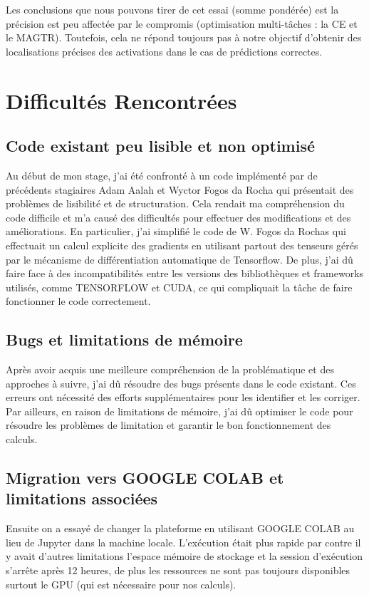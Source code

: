 \documentclass{report}
\begin{document}
{\newpage
Les conclusions que nous pouvons tirer de cet essai (somme pondérée) est la précision est peu affectée par le compromis (optimisation multi-tâches : la CE et le MAGTR). Toutefois, cela ne répond toujours pas à notre objectif d'obtenir des localisations précises des activations dans le cas de prédictions correctes.


\chapter{Difficultés Rencontrées}
\section{Code existant peu lisible et non optimisé}
    \hspace{1.6cm}Au début de mon stage, j'ai été confronté à un code implémenté par de précédents stagiaires Adam Aalah\cite{Adam21} et Wyctor Fogos da Rocha \cite{Wyctor22} qui présentait des problèmes de lisibilité et de structuration. Cela rendait ma compréhension du code difficile et m'a causé des difficultés pour effectuer des modifications et des améliorations. En particulier, j'ai simplifié le code de W. Fogos da Rochas qui effectuait un calcul explicite des gradients en utilisant partout des tenseurs gérés par le mécanisme de différentiation automatique de Tensorflow. De plus, j'ai dû faire face à des incompatibilités entre les versions des bibliothèques et frameworks utilisés, comme TENSORFLOW\cite{tensorflow2015-whitepaper} et CUDA\cite{nvidia_cuda_guide}, ce qui compliquait la tâche de faire fonctionner le code correctement.
\section{Bugs et limitations de mémoire}    
    \hspace{1.6cm}Après avoir acquis une meilleure compréhension de la problématique et des approches à suivre, j'ai dû résoudre des bugs présents dans le code existant. Ces erreurs ont nécessité des efforts supplémentaires pour les identifier et les corriger. Par ailleurs, en raison de limitations de mémoire, j'ai dû optimiser le code pour résoudre les problèmes de limitation et garantir le bon fonctionnement des calculs.
\section{Migration vers GOOGLE COLAB et limitations associées}
    \hspace{1.6cm}Ensuite on a essayé de changer la plateforme en utilisant GOOGLE COLAB\cite{google_colab} au lieu de Jupyter\cite{jupyter} dans la machine locale. L'exécution était plus rapide par contre il y avait d'autres limitations l’espace mémoire de stockage et la session d'exécution s'arrête après 12 heures, de plus les ressources ne sont pas toujours disponibles surtout le GPU (qui est nécessaire pour nos calculs).

}
\end{document}
